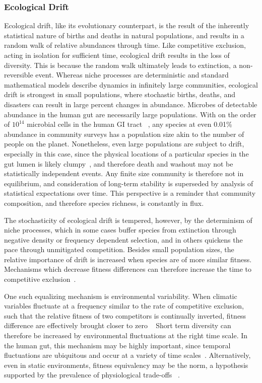 \documentclass[12pt]{article}
\begin{document}
\subsubsection{Ecological Drift}
Ecological drift, like its evolutionary counterpart, is the result
of the inherently statistical nature of births and deaths in
natural populations, and results in a random walk of
relative abundances through time.
Like competitive exclusion, acting in isolation for
sufficient time,
ecological drift results in the loss of diversity.
This is because the random walk ultimately
leads to extinction, a non-reversible event.
Whereas niche processes are deterministic and standard mathematical
models describe dynamics in infinitely large communities,
ecological drift is strongest in small populations, where
stochastic births, deaths, and disasters can result in large
percent changes in abundance.
Microbes of detectable abundance in the human gut are necessarily
large populations.
With on the order of \(10^{14}\) microbial cells in the human GI tract%
~\citep{Whitman1998},
any species at even 0.01\% abundance in community surveys
has a population size akin to the number of people on the planet.
Nonetheless, even large populations are subject to drift,
especially in this case,
since the physical locations of a particular species in the gut lumen is likely
clumpy~\citep{Green2007},
and therefore death and washout may not be statistically independent events.
Any finite size community is therefore not in equilibrium,
and consideration of long-term stability is superseded by
analysis of statistical expectations over time.
This perspective is a reminder that community composition,
and therefore species richness, is constantly in flux.

The stochasticity of ecological drift is tempered, however,
by the determinism of niche processes,
which in some cases buffer species from extinction through
negative density or frequency dependent selection,
and in others quickens the pace through unmitigated competition.
Besides small population sizes, the relative importance of
drift is increased when species are of more similar fitness.
Mechanisms which decrease fitness differences can therefore
increase the time to competitive exclusion~\citep{Chesson2000,Adler2007}.

One such equalizing mechanism is environmental variability.
When climatic variables fluctuate at a frequency similar to the
rate of competitive exclusion, such that the relative fitness of
two competitors is continually inverted,
fitness difference are effectively brought closer to zero%
~\citep{Hutchinson1961,Chesson1981}
Short term diversity can therefore be increased by
environmental fluctuations at the right time scale.
In the human gut, this mechanism may be highly important,
since temporal fluctuations are ubiquitous and occur at a variety of time
scales~\citep{Thaiss2014}.
Alternatively, even in static environments,
fitness equivalency may be the norm,
a hypothesis supported by the prevalence of physiological trade-offs%
~\citep{Adler2007}.
\end{document}
